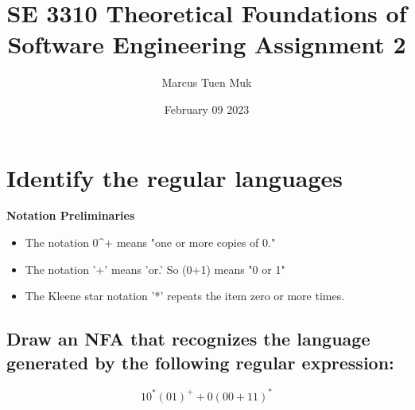 \documentclass[12pt]{article}
\title{SE 3310 Theoretical Foundations of Software Engineering Assignment 2}
\author{Marcus Tuen Muk}
\date{February 09 2023}
\begin{document}
    \begin{titlepage}
        \clearpage\maketitle
        \thispagestyle{empty}
    \end{titlepage}

    \section{Identify the regular languages}
        \textbf{Notation Preliminaries}
        \begin{itemize}
            \item The notation 0^+ means "one or more copies of 0."
            \item The notation '+' means 'or.' So (0+1) means "0 or 1"
            \item The Kleene star notation '*' repeats the item zero or more times. 
        \end{itemize}
        

        \subsection{Draw an NFA that recognizes the language generated by the following regular expression:}
            \[10^*(01)^++0(00+11)^*\]
\end{document}
